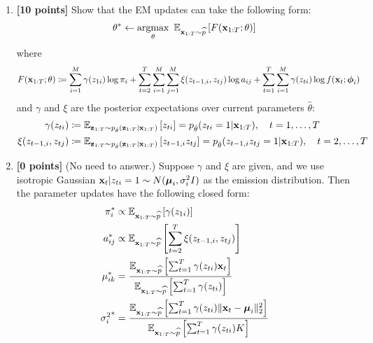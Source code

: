 \documentclass{article}
\begin{document}
\begin{enumerate}

\item 
\textbf{[10 points]}
Show that the EM updates can take the following form:
\begin{align}
\theta^{*} \gets \mathop{\mathrm{argmax}}_\theta \  
\mathbb{E}_{
\mathbf{x}_{1:T} \sim \widehat{p}}  \left[ 
F(\mathbf{x}_{1:T}; \theta)
\right]
\end{align}
where 
\begin{align}
F(\mathbf{x}_{1:T}; \theta)
& \coloneqq
\sum_{i=1}^{M} \gamma(z_{1i}) \log \pi_i
+ \sum_{t=2}^{T} \sum_{i=1}^{M} \sum_{j=1}^{M} \xi(z_{t-1,i}, z_{tj}) \log a_{ij}  + \sum_{t=1}^{T} \sum_{i=1}^{M} \gamma(z_{ti}) \log f(\mathbf{x}_t; \boldsymbol{\phi}_i)
\end{align}
and  $ \gamma $ and $ \xi $ are the posterior expectations over current parameters $ \hat{\theta} $:
\begin{align}
\gamma(z_{ti}) & \coloneqq \mathbb{E}_{
\mathbf{z}_{1:T} \sim p_{\hat{\theta}} (\mathbf{z}_{1:T} | \mathbf{x}_{1:T}) }\left[ 
z_{ti} 
\right] 
= p_{\hat{\theta}} (z_{ti} = 1| \mathbf{x}_{1:T}), \quad t = 1, \dotsc, T \\
\xi(z_{t-1,i}, z_{tj}) & \coloneqq \mathbb{E}_{
\mathbf{z}_{1:T} \sim p_{\hat{\theta}} (\mathbf{z}_{1:T} | \mathbf{x}_{1:T}) } \left[ 
z_{t-1,i} z_{tj}  
\right]
= p_{\hat{\theta}} (z_{t-1,i} z_{tj} = 1| \mathbf{x}_{1:T}), \quad t = 2, \dotsc, T 
\end{align}












\item 
\textbf{[0 points]}
(No need to answer.)
Suppose $ \gamma $ and $ \xi $ are given, and we use isotropic Gaussian $ \mathbf{x}_t | z_{ti} = 1 \sim N (\boldsymbol{\mu}_i, \sigma_i^2 I) $ as the emission distribution. 
Then the parameter updates have the following closed form:
\begin{align}
\pi_i^* & \propto \mathbb{E}_{
\mathbf{x}_{1:T} \sim \widehat{p}}  \left[ 
\gamma(z_{1i})
\right] \\
a_{ij}^* & \propto \mathbb{E}_{
\mathbf{x}_{1:T} \sim \widehat{p}}  \left[ 
\sum_{t=2}^{T} \xi(z_{t-1,i}, z_{tj})
\right] \\
\mu_{ik}^* & = 
\frac{ \mathbb{E}_{
\mathbf{x}_{1:T} \sim \widehat{p}}  \left[ 
\sum_{t=1}^T \gamma(z_{ti}) \mathbf{x}_t  \right]
}{  \mathbb{E}_{
\mathbf{x}_{1:T} \sim \widehat{p}}  \left[ 
\sum_{t=1}^T \gamma(z_{ti})  \right]
}  \\
{\sigma_i^2}^*  & = 
\frac{ \mathbb{E}_{
\mathbf{x}_{1:T} \sim \widehat{p}}  \left[ 
\sum_{t=1}^T \gamma(z_{ti})  \| \mathbf{x}_t - \boldsymbol{\mu}_i \|_2^2 \right] 
}{ \mathbb{E}_{
\mathbf{x}_{1:T} \sim \widehat{p}}  \left[ 
\sum_{t=1}^T \gamma(z_{ti}) K \right]
}
\end{align}


\end{enumerate}
\end{document}
